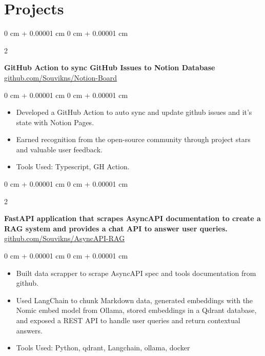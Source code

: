 \documentclass[10pt, letterpaper]{article}
\newenvironment{highlights}{
    \begin{itemize}[
        topsep=0.10 cm,
        parsep=0.10 cm,
        partopsep=0pt,
        itemsep=0pt,
        leftmargin=0 cm + 10pt
    ]
}{
    \end{itemize}
} %
\newenvironment{onecolentry}{
    \begin{adjustwidth}{
        0 cm + 0.00001 cm
    }{
        0 cm + 0.00001 cm
    }
}{
    \end{adjustwidth}
} %
\newenvironment{twocolentry}[2][]{
    \onecolentry
    \def\secondColumn{#2}
    \setcolumnwidth{\fill, 4.5 cm}
    \begin{paracol}{2}
}{
    \switchcolumn \raggedleft \secondColumn
    \end{paracol}
    \endonecolentry
} %
\begin{document}
    \section{Projects}



        
        \begin{twocolentry}{
            \href{https://github.com/Souvikns/Notion-Board}{github.com/Souvikns/Notion-Board}
        }
            \textbf{GitHub Action to sync GitHub Issues to Notion Database}\end{twocolentry}

        \vspace{0.10 cm}
        \begin{onecolentry}
            \begin{highlights}
                \item Developed a GitHub Action to auto sync and update github issues and it's state with Notion Pages.
                \item Earned recognition from the open-source community through project stars and valuable user feedback.
                \item Tools Used: Typescript, GH Action.
                
            \end{highlights}
        \end{onecolentry}


        \begin{twocolentry}{
            \href{https://github.com/Souvikns/asyncapi-rag}{github.com/Souvikns/AsyncAPI-RAG}
        }
            \textbf{FastAPI application that scrapes AsyncAPI documentation to create a RAG system and provides a chat API to answer user queries.}\end{twocolentry}

        \vspace{0.10 cm}
        \begin{onecolentry}
            \begin{highlights}
                \item Built data scrapper to scrape AsyncAPI spec and tools documentation from github.
                \item Used LangChain to chunk Markdown data, generated embeddings with the Nomic embed model from Ollama, stored embeddings in a Qdrant database, and exposed a REST API to handle user queries and return contextual answers.
                \item Tools Used: Python, qdrant, Langchain, ollama, docker 
                
            \end{highlights}
        \end{onecolentry}
\end{document}
